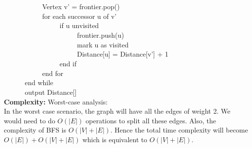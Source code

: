 \documentclass[12pt]{article}
\begin{document}
\begin{enumerate}
\verb|		|\verb|		|Vertex v' = frontier.pop() \\
\verb|		|\verb|		|for each successor u of v'\\
\verb|		|\verb|		|\verb|		|if u unvisited\\
\verb|		|\verb|		|\verb|		|\verb|		|frontier.push(u)\\
\verb|		|\verb|		|\verb|		|\verb|		|mark u as visited \\
\verb|		|\verb|		|\verb|		|\verb|		|Distance[u] = Distance[v'] + 1\\
\verb|		|\verb|		|\verb|		|end if \\
\verb|		|\verb|		|end for \\
\verb|		|end while\\
\verb|		|output Distance[]\\
\textbf{Complexity:} Worst-case analysis: \\
In the worst case scenario, the graph will have all the edges of weight 2. We would need to do $O(|E|)$ operations to split all these edges. Also, the complexity of BFS is $O(|V|+|E|)$. Hence the total time complexity will become $O(|E|) + O(|V|+|E|)$ which is equivalent to $O(|V|+|E|)$.\\


\end{enumerate}
\end{document}
